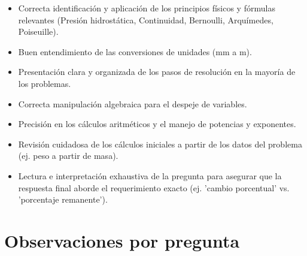 \documentclass[11pt,a4paper]{article}
\begin{document}
\vspace{4pt}
\begin{minipage}[t]{0.48\linewidth}
  \begin{tcolorbox}[cajaFortaleza, title={Fortalezas}]
\begin{itemize}[leftmargin=1.5em, itemsep=2pt]
  \item Correcta identificación y aplicación de los principios físicos y fórmulas relevantes (Presión hidrostática, Continuidad, Bernoulli, Arquímedes, Poiseuille).
  \item Buen entendimiento de las conversiones de unidades (mm a m).
  \item Presentación clara y organizada de los pasos de resolución en la mayoría de los problemas.
  \item Correcta manipulación algebraica para el despeje de variables.
\end{itemize}
  \end{tcolorbox}
\end{minipage}
\hfill
\begin{minipage}[t]{0.48\linewidth}
  \begin{tcolorbox}[cajaMejora, title={Areas de mejora}]
\begin{itemize}[leftmargin=1.5em, itemsep=2pt]
  \item Precisión en los cálculos aritméticos y el manejo de potencias y exponentes.
  \item Revisión cuidadosa de los cálculos iniciales a partir de los datos del problema (ej. peso a partir de masa).
  \item Lectura e interpretación exhaustiva de la pregunta para asegurar que la respuesta final aborde el requerimiento exacto (ej. 'cambio porcentual' vs. 'porcentaje remanente').
\end{itemize}
  \end{tcolorbox}
\end{minipage}

\section*{Observaciones por pregunta}
\end{document}
